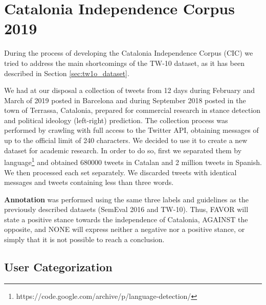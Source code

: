 \documentclass[10pt, a4paper]{article}
\begin{document}







\section{Catalonia Independence Corpus 2019}\label{sec:independence}

During the process of developing the Catalonia Independence Corpus (CIC) we tried to address the main shortcomings of the TW-10 dataset, as it has been described in Section \ref{sec:tw1o_dataset}.

We had at our disposal a collection of tweets from 12 days during February and March of 2019 posted in Barcelona and during September 2018 posted in the town of Terrassa, Catalonia, prepared for commercial research in stance detection and political ideology (left-right) prediction. The collection process was performed by crawling with full access to the Twitter API, obtaining messages of up to the official limit of 240 characters. We decided to use it to create a new dataset for academic research. In order to do so, first we separated them by language\footnote{https://code.google.com/archive/p/language-detection/} and obtained 680000 tweets in Catalan and 2 million tweets in Spanish. We then processed each set separately. We discarded tweets with identical messages and tweets containing less than three words.

\textbf{Annotation} was performed using the same three labels and guidelines as the previously described datasets (SemEval 2016 and TW-10). Thus, FAVOR will state a positive stance towards the independence of Catalonia, AGAINST the opposite, and NONE will express neither a negative nor a positive stance, or simply that it is not possible to reach a conclusion.

\subsection{User Categorization}\label{sec:categ-at-user}
\end{document}
